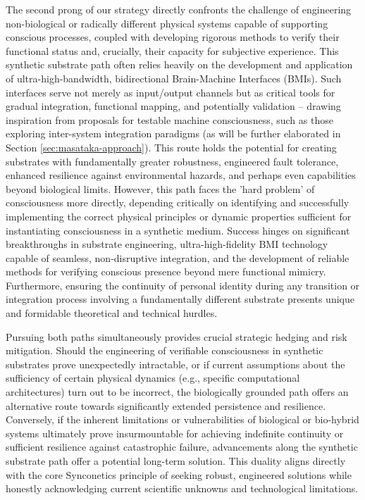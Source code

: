 \documentclass[10pt]{article}
\begin{document}
\begin{sloppypar}
  The second prong of our strategy directly confronts the challenge of engineering non-biological or radically different physical systems capable of supporting conscious processes, coupled with developing rigorous methods to verify their functional status and, crucially, their capacity for subjective experience. This synthetic substrate path often relies heavily on the development and application of ultra-high-bandwidth, bidirectional Brain-Machine Interfaces (BMIs). Such interfaces serve not merely as input/output channels but as critical tools for gradual integration, functional mapping, and potentially validation – drawing inspiration from proposals for testable machine consciousness, such as those exploring inter-system integration paradigms (as will be further elaborated in Section \ref{sec:masataka-approach}). This route holds the potential for creating substrates with fundamentally greater robustness, engineered fault tolerance, enhanced resilience against environmental hazards, and perhaps even capabilities beyond biological limits. However, this path faces the 'hard problem' of consciousness more directly, depending critically on identifying and successfully implementing the correct physical principles or dynamic properties sufficient for instantiating consciousness in a synthetic medium. Success hinges on significant breakthroughs in substrate engineering, ultra-high-fidelity BMI technology capable of seamless, non-disruptive integration, and the development of reliable methods for verifying conscious presence beyond mere functional mimicry. Furthermore, ensuring the continuity of personal identity during any transition or integration process involving a fundamentally different substrate presents unique and formidable theoretical and technical hurdles.

  Pursuing both paths simultaneously provides crucial strategic hedging and risk mitigation. Should the engineering of verifiable consciousness in synthetic substrates prove unexpectedly intractable, or if current assumptions about the sufficiency of certain physical dynamics (e.g., specific computational architectures) turn out to be incorrect, the biologically grounded path offers an alternative route towards significantly extended persistence and resilience. Conversely, if the inherent limitations or vulnerabilities of biological or bio-hybrid systems ultimately prove insurmountable for achieving indefinite continuity or sufficient resilience against catastrophic failure, advancements along the synthetic substrate path offer a potential long-term solution. This duality aligns directly with the core Synconetics principle of seeking robust, engineered solutions while honestly acknowledging current scientific unknowns and technological limitations.


\end{sloppypar}
\end{document}
